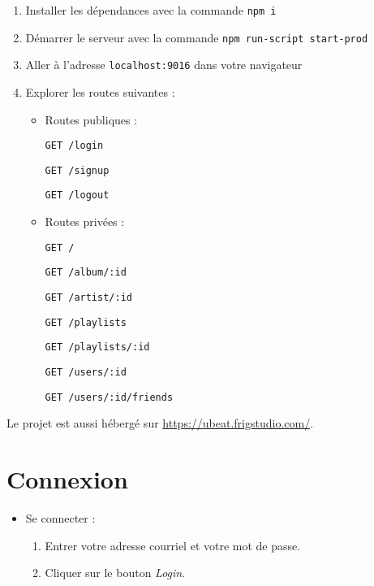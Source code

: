 \documentclass[12pt, letterpaper]{article}
\begin{document}
    \begin{enumerate}
        \item Installer les dépendances avec la commande \verb|npm i|
        \item Démarrer le serveur avec la commande \verb|npm run-script start-prod|
        \item Aller à l'adresse \verb|localhost:9016| dans votre navigateur
        \item Explorer les routes suivantes : \par
        \begin{itemize}
            \item Routes publiques : \par
            \verb|GET /login| \par
            \verb|GET /signup| \par
            \verb|GET /logout|
            
            \item Routes privées : \par
            \verb|GET /| \par
            \verb|GET /album/:id| \par
            \verb|GET /artist/:id| \par
            \verb|GET /playlists| \par
            \verb|GET /playlists/:id| \par
            \verb|GET /users/:id| \par
            \verb|GET /users/:id/friends|
        \end{itemize}
    \end{enumerate}

    \bigskip

    Le projet est aussi hébergé sur \url{https://ubeat.frigstudio.com/}.
    
    \section*{Connexion}
    \begin{itemize}
        \item Se connecter :
        \begin{enumerate}
            \item Entrer votre adresse courriel et votre mot de passe.
            \item Cliquer sur le bouton \textit{Login}.
        \end{enumerate}
    \end{itemize}
    
\end{document}
